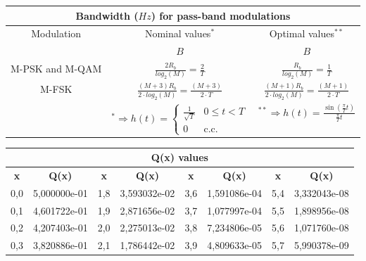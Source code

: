 \documentclass[en]{article}
\DeclareMathOperator{\sen}{sin}
\begin{document}
\begin{center}
        \renewcommand{\arraystretch}{2}
        \begin{tabular}{|c|c|c|}
            \multicolumn{3}{c}{{\bf Bandwidth ($Hz$) for pass-band modulations}} \\
            \hline
            \multirow{2}{*}{Modulation} & Nominal values$^*$ & Optimal values$^{**}$ \\
            \cline{2-3}
            & $B$ & $B$ \\
            \hline
            M-PSK and M-QAM & $\displaystyle\frac{2 R_b}{log_2(M)} = \displaystyle\frac{2}{T}$ & $\displaystyle\frac{R_b}{log_2(M)} = \displaystyle\frac{1}{T}$ \\[1ex]
            \hline
            M-FSK & $\displaystyle\frac{(M+3) R_b}{2 \cdot log_2(M)} = \displaystyle\frac{(M+3)}{2\cdot T}$ & $\displaystyle\frac{(M+1) R_b}{2 \cdot log_2(M)} = \displaystyle\frac{(M+1)}{2\cdot T}$ \\[1ex]
            \hline
            & $^* \Rightarrow h(t) = \left \{ \begin{array}{lc} \displaystyle\frac{1}{\sqrt{T}} & 0\leq t < T \\ 0 & \text{c.c.} \end{array}\right. $ & $^{**} \Rightarrow h(t) = \displaystyle\frac{\sen\left ( \displaystyle\frac{\pi}{T} t \right ) }{\displaystyle\frac{\pi}{T}t}$ \\
            \hline
        \end{tabular}
        \renewcommand{\arraystretch}{1}
        \vspace{0.5cm}
    \begin{tabular}{cc|cc|cc|cc}
        \multicolumn{8}{c}{{\bf Q(x) values}} \\
        \hline
        {\bf x} & {\bf Q(x)} & {\bf x} & {\bf Q(x)} & {\bf x} & {\bf Q(x)} & {\bf x} & {\bf Q(x)} \\
        \hline
        0,0 & 5,000000e-01 & 1,8 & 3,593032e-02 & 3,6 & 1,591086e-04 & 5,4 & 3,332043e-08 \\
        0,1 & 4,601722e-01 & 1,9 & 2,871656e-02 & 3,7 & 1,077997e-04 & 5,5 & 1,898956e-08 \\
        0,2 & 4,207403e-01 & 2,0 & 2,275013e-02 & 3,8 & 7,234806e-05 & 5,6 & 1,071760e-08 \\
        0,3 & 3,820886e-01 & 2,1 & 1,786442e-02 & 3,9 & 4,809633e-05 & 5,7 & 5,990378e-09 \\

\end{tabular}
\end{center}
\end{document}

